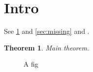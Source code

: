 \documentclass{article}
\newtheorem{thm}{Theorem}
\begin{document}
\section{Intro}\label{sec:intro}
See \ref{sec:intro} and \ref{sec:missing} and \cite{knuth84,lamport94}.
\begin{thm}\label{thm:main}Main theorem.\end{thm}
\begin{figure}\caption{A fig}\label{fig:one}\end{figure}

\end{document}
